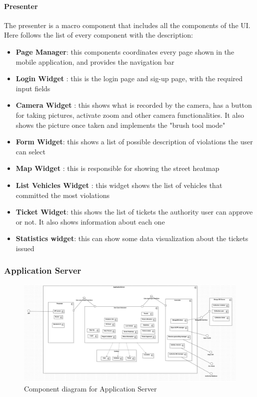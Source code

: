 \paragraph{Presenter}
The presenter is a macro component that includes all the components of the UI.
Here follows the list of every component with the description:
\begin{itemize}
  \item \textbf{Page Manager}: this components coordinates every page shown in the mobile application, and provides the navigation bar
  \item \textbf{Login Widget} : this is the login page and sig-up page, with the required input fields
  \item \textbf{Camera Widget} : this shows what is recorded by the camera, has a button for taking pictures, activate zoom and other camera functionalities. It also shows the picture once taken and implements the "brush tool mode"
  \item \textbf{Form Widget}: this shows a list of possible description of violations the user can select
  \item \textbf{Map Widget} : this is responsible for showing the street heatmap
  \item \textbf{List Vehicles Widget} : this widget shows the list of vehicles that committed the most violations
  \item \textbf{Ticket Widget}: this shows the list of tickets the authority user can approve or not. It also shows information about each one
  \item \textbf{Statistics widget}: this can show some data visualization about the tickets issued
\end{itemize}



\subsubsection{Application Server} \label{API}
\begin{figure}
\centering
\includegraphics[width=\textwidth]{Images/ComponentDiagram2.png}
\caption{\label{fig:compdiag2} Component diagram for Application Server}
\end{figure}


